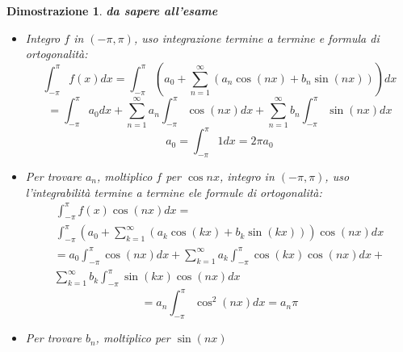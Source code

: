 \documentclass[10pt,landscape, a4paper]{article}
\newtheorem{demnstrn}{Dimostrazione}
\newenvironment{dimostrazione}{\begin{mdframed}[backgroundcolor=white]\begin{demnstrn}}{\end{demnstrn}\end{mdframed}}
\begin{document}
\begin{multicols}{3}
\begin{dimostrazione}
	\emph{\textbf{da sapere all'esame}}
	\begin{itemize}
		\item Integro $f$ in $\left(-\pi,\pi\right)$, uso integrazione termine a termine e formula di ortogonalità:
			\begin{equation}
				\int_{-\pi}^\pi f(x)dx = \int_{-\pi}^\pi \left(a_0 + \sum_{n=1}^\infty \left(a_n \cos(nx) + b_n \sin(nx)\right)\right)dx
			\end{equation}
			\begin{equation}
				= \int_{-\pi}^\pi a_0dx + \sum_{n=1}^\infty a_n \int_{-\pi}^\pi \cos(nx)dx + \sum_{n=1}^\infty b_n \int_{-\pi}^\pi  \sin(nx)dx
			\end{equation}
			\begin{equation}
				a_0 = \int_{-\pi}^\pi 1dx = 2\pi a_0
			\end{equation}
		\item Per trovare $a_n$, moltiplico $f$ per $\cos{nx}$, integro in $\left(-\pi,\pi\right)$, uso l'integrabilità termine a termine  ele formule di ortogonalità:
			\begin{multline}
				\int_{-\pi}^\pi f(x)\cos(nx)dx = \\ \int_{-\pi}^\pi \left(a_0 + \sum_{k=1}^\infty \left(a_k \cos(kx) + b_k \sin(kx)\right)\right)\cos(nx)dx
			\end{multline}
			\begin{multline}
				= a_0 \int_{-\pi}^\pi \cos(nx)dx + \sum_{k=1}^\infty a_k \int_{-\pi}^\pi \cos(kx)\cos(nx)dx + \\ \sum_{k=1}^\infty b_k \int_{-\pi}^\pi \sin(kx)\cos(nx)dx
			\end{multline}
			\begin{equation}
				= a_n \int_{-\pi}^\pi \cos^2(nx)dx = a_n\pi
			\end{equation}
		\item Per trovare $b_n$, moltiplico per $\sin{(nx)}$
	\end{itemize}
\end{dimostrazione}


\end{multicols}
\end{document}
